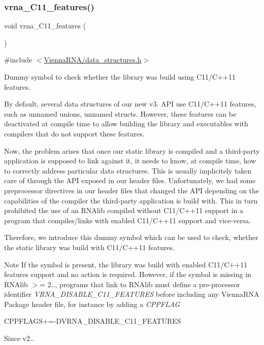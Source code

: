 \subsubsection{\texorpdfstring{vrna\+\_\+\+C11\+\_\+features()}{vrna\_C11\_features()}}
{\footnotesize\ttfamily void vrna\+\_\+\+C11\+\_\+features (\begin{DoxyParamCaption}\item[{void}]{ }\end{DoxyParamCaption})}



{\ttfamily \#include $<$\mbox{\hyperlink{data__structures_8h}{Vienna\+R\+N\+A/data\+\_\+structures.\+h}}$>$}



Dummy symbol to check whether the library was build using C11/\+C++11 features. 

By default, several data structures of our new v3. A\+PI use C11/\+C++11 features, such as unnamed unions, unnamed structs. However, these features can be deactivated at compile time to allow building the library and executables with compilers that do not support these features.

Now, the problem arises that once our static library is compiled and a third-\/party application is supposed to link against it, it needs to know, at compile time, how to correctly address particular data structures. This is usually implicitely taken care of through the A\+PI exposed in our header files. Unfortunately, we had some preprocessor directives in our header files that changed the A\+PI depending on the capabilities of the compiler the third-\/party application is build with. This in turn prohibited the use of an R\+N\+Alib compiled without C11/\+C++11 support in a program that compiles/links with enabled C11/\+C++11 support and vice-\/versa.

Therefore, we introduce this dummy symbol which can be used to check, whether the static library was build with C11/\+C++11 features.

\begin{DoxyNote}{Note}
If the symbol is present, the library was build with enabled C11/\+C++11 features support and no action is required. However, if the symbol is missing in R\+N\+Alib $>$= 2.., programs that link to R\+N\+Alib must define a pre-\/processor identifier {\itshape V\+R\+N\+A\+\_\+\+D\+I\+S\+A\+B\+L\+E\+\_\+\+C11\+\_\+\+F\+E\+A\+T\+U\+R\+ES} before including any Vienna\+R\+NA Package header file, for instance by adding a {\itshape C\+P\+P\+F\+L\+AG} 
\begin{DoxyCode}
CPPFLAGS+=-DVRNA\_DISABLE\_C11\_FEATURES
\end{DoxyCode}

\end{DoxyNote}
\begin{DoxySince}{Since}
v2.. 
\end{DoxySince}
